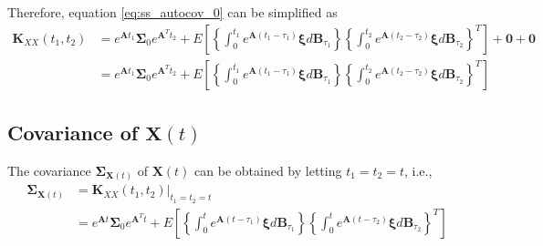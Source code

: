 \documentclass{article}
\begin{document}
Therefore, equation \ref{eq:ss_autocov_0} can be simplified as
\begin{equation}
\begin{aligned}
\mathbf{K}_{XX} (t_1, t_2) &=e^{\mathbf{A}t_{1}} \mathbf{\Sigma}_0 e^{\mathbf{A}^T t_{2}}  + E \left [ \left \{ \int_0^{t_{1}} e^{\mathbf{A}(t_{1}-\tau_1)} \boldsymbol{\xi} d\mathbf{B}_{\tau_1} \right \}  \left \{ \int_0^{t_{2}} e^{\mathbf{A}(t_{2}-\tau_2)} \boldsymbol{\xi} d\mathbf{B}_{\tau_2} \right \}^T \right ] + \mathbf{0}+ \mathbf{0} \\
&=e^{\mathbf{A}t_{1}} \mathbf{\Sigma}_0 e^{\mathbf{A}^T t_{2}}  + E \left [ \left \{ \int_0^{t_{1}} e^{\mathbf{A}(t_{1}-\tau_1)} \boldsymbol{\xi} d\mathbf{B}_{\tau_1} \right \}  \left \{ \int_0^{t_{2}} e^{\mathbf{A}(t_{2}-\tau_2)} \boldsymbol{\xi} d\mathbf{B}_{\tau_2} \right \}^T \right ]
\end{aligned}
\label{eq:ss_autocov_1}
\end{equation}

\subsection*{Covariance of $\mathbf{X}(t)$ }
The covariance $\mathbf{\Sigma}_{\mathbf{X}(t)}$ of $\mathbf{X}(t)$ can be obtained by letting $t_{1}=t_{2}=t$, i.e.,
\begin{equation}
\begin{aligned}
\mathbf{\Sigma}_{\mathbf{X}(t)} &= {\mathbf{K}_{XX} (t_{1}, t_{2})|}_{t_{1}=t_{2}=t} \\
& =e^{\mathbf{A}t} \mathbf{\Sigma}_0 e^{\mathbf{A}^Tt}+ E \left [ \left \{ \int_0^{t} e^{\mathbf{A}(t-\tau_1)} \boldsymbol{\xi} d\mathbf{B}_{\tau_1} \right \}  \left \{ \int_0^{t} e^{\mathbf{A}(t-\tau_2)} \boldsymbol{\xi} d\mathbf{B}_{\tau_2} \right \}^T \right ]
\end{aligned}
\label{eq:ss_cov_t_0}
\end{equation}
\end{document}
